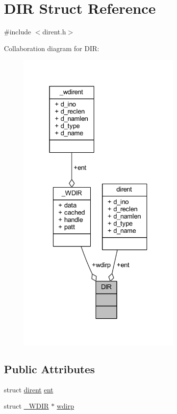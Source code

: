 \hypertarget{struct_d_i_r}{\section{D\+I\+R Struct Reference}
\label{struct_d_i_r}
}


{\ttfamily \#include $<$dirent.\+h$>$}



Collaboration diagram for D\+I\+R\+:
\nopagebreak
\begin{figure}[H]
\begin{center}
\leavevmode
\includegraphics[width=229pt]{struct_d_i_r__coll__graph}
\end{center}
\end{figure}
\subsection*{Public Attributes}
\begin{DoxyCompactItemize}
\item 
struct \hyperlink{structdirent}{dirent} \hyperlink{struct_d_i_r_a59e9f5211cbb2f8e5b2807ccfdd2a7fc}{ent}
\item 
struct \hyperlink{struct___w_d_i_r}{\+\_\+\+W\+D\+I\+R} $\ast$ \hyperlink{struct_d_i_r_a29362d4a3d7f809d0f5418b26cac5d41}{wdirp}
\end{DoxyCompactItemize}


